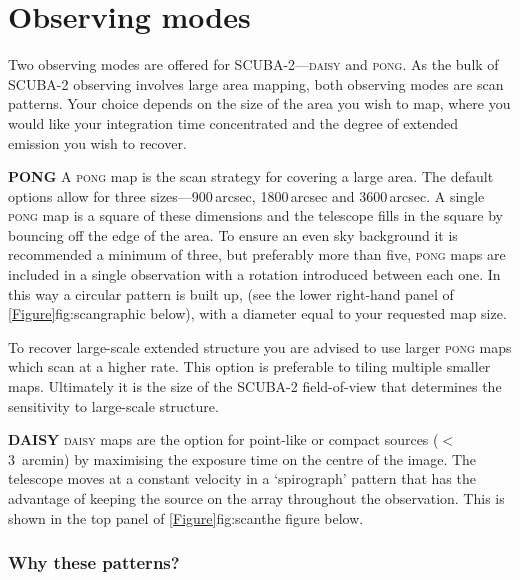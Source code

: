 \section{Observing modes}
\label{sec:mmodes}

Two observing modes are offered for SCUBA-2---\textsc{daisy} and
\textsc{pong}. As the bulk of \mbox{SCUBA-2} observing involves
large area mapping, both observing modes are scan patterns. Your
choice depends on the size of the area you wish to map, where you
would like your integration time concentrated and the degree of
extended emission you wish to recover.


\begin{aligndesc}

\item[\textbf{PONG}] A \textsc{pong} map is the scan strategy for
  covering a large area. The default options allow for three
  sizes---900\,arcsec, 1800\,arcsec and 3600\,arcsec. A single
  \textsc{pong} map is a square of these dimensions and the telescope
  fills in the square by bouncing off the edge of the area. To ensure
  an even sky background it is recommended a minimum of three, but
  preferably more than five, \textsc{pong} maps are included in a
  single observation with a rotation introduced between each one. In
  this way a circular pattern is built up, (see the lower right-hand
  panel of \cref{Figure}{fig:scan}{graphic below}), with a diameter
  equal to your requested map size.

  To recover large-scale extended structure you are advised to use
  larger \textsc{pong} maps which scan at a higher rate. This option
  is preferable to tiling multiple smaller maps. Ultimately it is the
  size of the SCUBA-2 field-of-view that determines the sensitivity to
  large-scale structure.

\item[\textbf{DAISY}] \textsc{daisy} maps are the option for
  point-like or compact sources ($<$3~arcmin) by maximising the
  exposure time on the centre of the image. The telescope moves at a
  constant velocity in a `spirograph' pattern that has the advantage
  of keeping the source on the array throughout the observation. This
  is shown in the top panel of \cref{Figure}{fig:scan}{the figure
    below}.

\end{aligndesc}

\subsubsection*{Why these patterns?}

